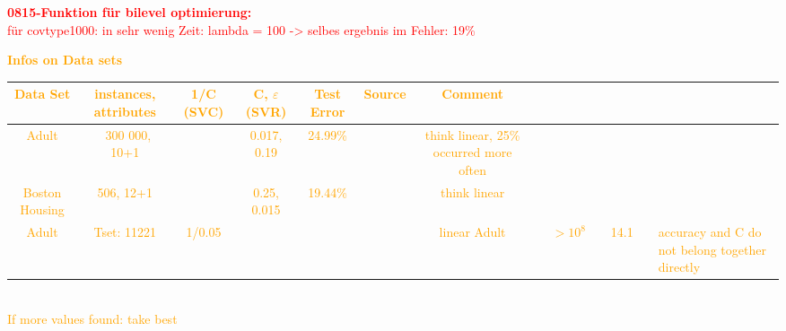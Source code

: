 \textcolor{red}{\textbf{0815-Funktion f\"ur bilevel optimierung:}\\
für covtype1000: in sehr wenig Zeit: lambda = 100 -> selbes ergebnis im Fehler: 19\%\\
}


\textcolor{orange}{\textbf{Infos on Data sets} \\
\begin{tabular}{c|c|c|c|c|c|c}
Data Set & instances, attributes & 1/C (SVC) & C, \(\varepsilon\) (SVR) & Test Error & Source & Comment \\
\hline
Adult & ~300 000, 10+1 & & 0.017, 0.19 & 24.99\% & \cite{Musicant2004} & think linear, 25\% occurred more often \cite{Musicant2000} \\
Boston Housing & 506, 12+1 & & 0.25, 0.015 & 19.44\% & \cite{Musicant2004} & think linear\\
Adult & Tset: 11221 & 1/0.05 & & & \cite{Platt1999} & linear
Adult & & \(>10^8\) & & 14.1 & \cite{Kao2004} & accuracy and C do not belong together directly\\
\end{tabular}\\
If more values found: take best}













